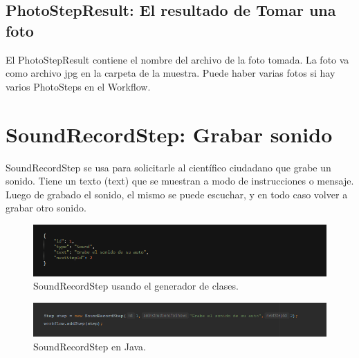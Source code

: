 \subsection{PhotoStepResult: El resultado de Tomar una foto}
El PhotoStepResult contiene el nombre del archivo de la foto tomada. La foto va como archivo jpg en la carpeta de la muestra.
Puede haber varias fotos si hay varios PhotoSteps en el Workflow.




\section{SoundRecordStep: Grabar sonido}
SoundRecordStep  se usa para solicitarle al científico ciudadano que grabe un sonido. Tiene un texto (text) que se muestran a modo de instrucciones o mensaje. Luego de grabado el sonido, el mismo se puede escuchar, y en todo caso volver a grabar otro sonido.


\begin{figure}[H]
  \centering
    \includegraphics[scale=0.6]{50-anexos/C-steps/sound_json.png} 
    \caption{SoundRecordStep usando el generador de clases.}
\end{figure}	

\begin{figure}[H]
  \centering
    \includegraphics[scale=0.6]{50-anexos/C-steps/sound_java.png} 
    \caption{SoundRecordStep en Java.}
\end{figure}

